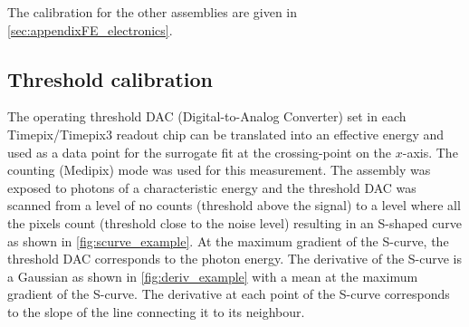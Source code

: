 The calibration for the other assemblies are given in \cref{sec:appendixFE_electronics}.


\subsection{Threshold calibration} \label{sec:threshold}


The operating threshold DAC (Digital-to-Analog Converter) set in each
Timepix/Timepix3 readout chip can be translated into an effective
energy and used as a data point for the surrogate fit at the
crossing-point on the $x$-axis. The counting (Medipix) mode was used
for this measurement. The assembly was exposed to photons of a
characteristic energy and the threshold DAC was scanned from a level
of no counts (threshold above the signal) to a level where all the
pixels count (threshold close to the noise level) resulting in an
S-shaped curve as shown in \cref{fig:scurve_example}. At the
maximum gradient of the S-curve, the threshold DAC corresponds to the
photon energy. The derivative of the S-curve is a Gaussian as shown in
\cref{fig:deriv_example} with a mean at the maximum gradient of
the S-curve. The derivative at each point of the S-curve corresponds
to the slope of the line connecting it to its neighbour.

